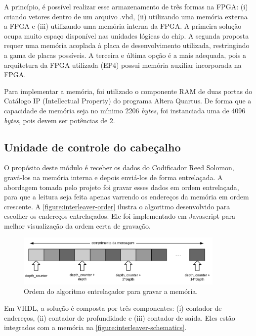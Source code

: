 	A princípio, é possível realizar esse armazenamento de três formas na FPGA: (i) criando vetores dentro de um arquivo .vhd, (ii) utilizando uma memória externa a FPGA e (iii) utilizando uma memória interna da FPGA. A primeira solução ocupa muito espaço disponível nas unidades lógicas do chip. A segunda proposta requer uma memória acoplada à placa de desenvolvimento utilizada, restringindo a gama de placas possíveis. A terceira e última opção é a mais adequada, pois a arquitetura da FPGA utilizada (EP4) possui memória auxiliar incorporada na FPGA.
	
	Para implementar a memória, foi utilizado o componente RAM de duas portas do Catálogo IP (Intellectual Property) do programa Altera Quartus. De forma que a capacidade de memória seja no mínimo 2206 \textit{bytes}, foi instanciada uma de 4096 \textit{bytes}, pois devem ser potências de 2.

	\subsection{Unidade de controle do cabeçalho}\label{section:interleaver-header-control}
	
	O propósito deste módulo é receber os dados do Codificador Reed Solomon, gravá-los na memória interna e depois enviá-los de forma entrelaçada. A abordagem tomada pelo projeto foi gravar esses dados em ordem entrelaçada, para que a leitura seja feita apenas varrendo os endereços da memória em ordem crescente. A \autoref{figure:interleaver-order} ilustra o algoritmo desenvolvido para escolher os endereços entrelaçados. Ele foi implementado em Javascript para melhor visualização da ordem certa de gravação.
	
	\begin{figure}[h]
		\caption{\label{figure:interleaver-order}Ordem do algoritmo entrelaçador para gravar a memória.}
		\centering
		\includegraphics[width=0.9\textwidth]{interleaver/order.pdf}
	\end{figure}
	
	Em VHDL, a solução é composta por três componentes: (i) contador de endereços, (ii) contador de profundidade e (iii) contador de saída. Eles estão integrados com a memória na \autoref{figure:interleaver-schematics}.
		
